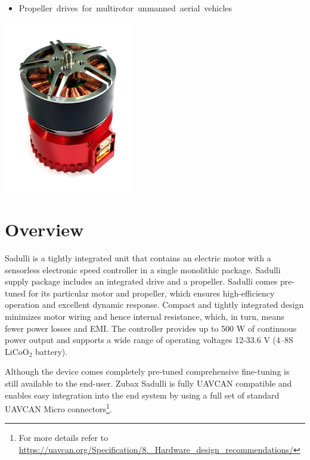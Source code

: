 \documentclass{document_templates/documentation_template_latex/zubaxdoc}
\begin{document}
\begin{titlepage}
\begin{itemize}
    \item \mbox{Propeller drives for multirotor unmanned aerial vehicles}
\end{itemize}

\centering
\includegraphics[width=0.42\textwidth]{figures/sadulli_grosso_pic}
\end{titlepage}

\tableofcontents
\BeginRightColumn
\listoffigures
\listoftables

\mainmatter

\chapter{Overview}
Sadulli is a tightly integrated unit that contains an electric motor with a sensorless electronic speed controller in a single monolithic package. Sadulli supply package includes an integrated drive and a propeller. Sadulli comes pre-tuned for its particular motor and propeller, which ensures high-efficiency operation and excellent dynamic response. 
Compact and tightly integrated design minimizes motor wiring and hence internal resistance, which, in turn, means fewer power losses and EMI.
The controller provides up to 500 W of continuous power output and supports a wide range of operating voltages 12-33.6 V (4–8S $\text{LiCoO}_\text{2}$ battery).

Although the device comes completely pre-tuned comprehensive fine-tuning is still available to the end-user.
Zubax Sadulli is fully UAVCAN compatible and enables easy integration into the end system by using a full set of standard UAVCAN Micro connectors\footnote{For more details refer to \url{https://uavcan.org/Specification/8._Hardware_design_recommendations/}}.
\end{document}
